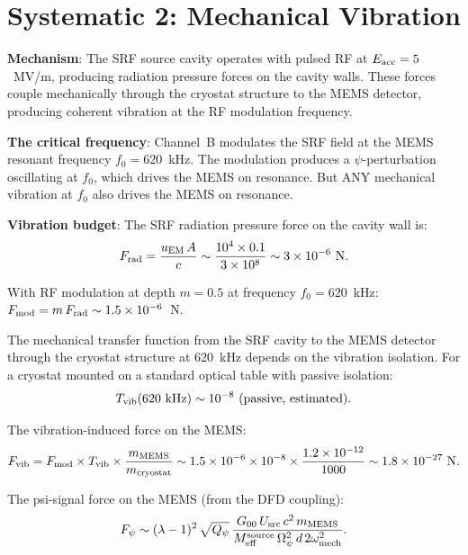 \documentclass[11pt]{article}
\newcommand{\lam}{\lambda}
\newcommand{\Opsi}{\Omega_\psi}
\newcommand{\Meff}{M_{\rm eff}}
\newcommand{\ee}[1]{\times 10^{#1}}
\newcommand{\Qpsi}{Q_\psi}
\theoremstyle{definition}
\theoremstyle{remark}
\begin{document}
\section{Systematic 2: Mechanical Vibration}
\label{sec:vibration}

\textbf{Mechanism}: The SRF source cavity operates with pulsed RF
at $E_{\rm acc} = 5$~MV/m, producing radiation pressure forces on
the cavity walls. These forces couple mechanically through the
cryostat structure to the MEMS detector, producing coherent vibration
at the RF modulation frequency.

\textbf{The critical frequency}: Channel~B modulates the SRF field
at the MEMS resonant frequency $f_0 = 620$~kHz. The modulation
produces a $\psi$-perturbation oscillating at $f_0$, which drives
the MEMS on resonance. But ANY mechanical vibration at $f_0$ also
drives the MEMS on resonance.

\textbf{Vibration budget}: The SRF radiation pressure force on the
cavity wall is:
\begin{equation}
F_{\rm rad} = \frac{u_{\rm EM}\,A}{c}
\sim \frac{10^4\times 0.1}{3\ee{8}} \sim 3\ee{-6}~\text{N}.
\end{equation}

With RF modulation at depth $m = 0.5$ at frequency $f_0 = 620$~kHz:
$F_{\rm mod} = m\,F_{\rm rad} \sim 1.5\ee{-6}$~N.

The mechanical transfer function from the SRF cavity to the MEMS
detector through the cryostat structure at 620~kHz depends on the
vibration isolation. For a cryostat mounted on a standard optical
table with passive isolation:
\begin{equation}
T_{\rm vib}(620~\text{kHz}) \sim 10^{-8}~\text{(passive, estimated)}.
\end{equation}

The vibration-induced force on the MEMS:
\begin{equation}
F_{\rm vib} = F_{\rm mod}\times T_{\rm vib}\times
\frac{m_{\rm MEMS}}{m_{\rm cryostat}}
\sim 1.5\ee{-6}\times 10^{-8}\times\frac{1.2\ee{-12}}{1000}
\sim 1.8\ee{-27}~\text{N}.
\end{equation}

The psi-signal force on the MEMS (from the DFD coupling):
\begin{equation}
F_\psi \sim (\lam-1)^2\,\sqrt{\Qpsi}\,
\frac{G_{00}\,U_{\rm src}\,c^2\,m_{\rm MEMS}}
{\Meff^{\rm source}\,\Opsi^2\,d\,2\omega_{\rm mech}^2}.
\end{equation}
\end{document}
